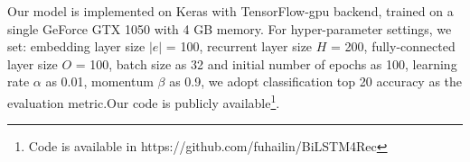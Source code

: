 \documentclass[runningheads]{llncs}
\begin{document}
Our model is implemented on Keras with TensorFlow-gpu backend, trained on a single GeForce GTX 1050 with 4 GB memory. For hyper-parameter settings, we set: embedding layer size $|e|$ = 100, recurrent layer size $H$ = 200, fully-connected layer size $O$ = 100, batch size as 32 and initial number of epochs as 100, learning rate $\alpha$ as 0.01, momentum $\beta $ as 0.9, we adopt classification top 20 accuracy as the evaluation metric.Our code is publicly available\footnote{Code is available in https://github.com/fuhailin/BiLSTM4Rec}.


\end{document}

